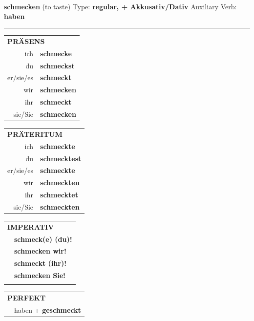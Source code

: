 \documentclass[10pt,a4paper]{revtex4-2}
\begin{document}
\begin{verbbox-dat}
    {\Large \bf schmecken} (to taste) \hfill Type: \textbf{regular, + Akkusativ/Dativ} \hfill Auxiliary Verb: \textbf{haben} 
    
     \vspace{5pt}

    \hrule
    
    \vspace{5pt}

  \begin{tabular}{rl}
     \multicolumn{2}{l}{\textbf{PRÄSENS} }\\
    ich & \textbf{schmecke}\\
    du & \textbf{schmeckst}\\
    er/sie/es & \textbf{schmeckt}\\
    wir & \textbf{schmecken}\\
    ihr & \textbf{schmeckt}\\
    sie/Sie & \textbf{schmecken}\\
  \end{tabular}
  \hfill
     \begin{tabular}{rl}
    \multicolumn{2}{l}{\textbf{PRÄTERITUM} }\\
    ich & \textbf{schmeckte}\\
    du & \textbf{schmecktest}\\
    er/sie/es & \textbf{schmeckte}\\
    wir & \textbf{schmeckten}\\
    ihr & \textbf{schmecktet}\\
    sie/Sie & \textbf{schmeckten}\\
  \end{tabular}
  \hfill
  \begin{tabular}{rl}
     \multicolumn{2}{l}{\textbf{IMPERATIV} }\\
   & \textbf{schmeck(e) (du)!}\\
   & \textbf{schmecken wir!}\\
   & \textbf{schmeckt (ihr)!}\\
   & \textbf{schmecken Sie!}\\
   & \vspace{10pt}
  \end{tabular}

    \vspace{10pt}

 \begin{tabular}{rl}
     \multicolumn{2}{l}{\textbf{PERFEKT}}\\
  &  haben + \textbf{geschmeckt}\\
  \end{tabular}
\hfill
   \begin{tabular}{rl}
   

\end{tabular}
\end{verbbox-dat}
\end{document}
